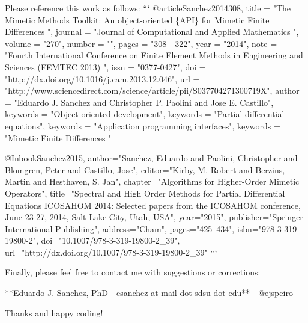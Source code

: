 \begin{DoxyVerbInclude}
Please reference this work as follows:
```
@article{Sanchez2014308,
  title = "The Mimetic Methods Toolkit: An object-oriented \{API\} for Mimetic
Finite Differences ",
  journal = "Journal of Computational and Applied Mathematics ",
  volume = "270",
  number = "",
  pages = "308 - 322",
  year = "2014",
  note = "Fourth International Conference on Finite Element Methods in
Engineering and Sciences (FEMTEC 2013) ",
  issn = "0377-0427",
  doi = "http://dx.doi.org/10.1016/j.cam.2013.12.046",
  url = "http://www.sciencedirect.com/science/article/pii/S037704271300719X",
  author = "Eduardo J. Sanchez and Christopher P. Paolini and Jose E. Castillo",
  keywords = "Object-oriented development",
  keywords = "Partial differential equations",
  keywords = "Application programming interfaces",
  keywords = "Mimetic Finite Differences "
}

@Inbook{Sanchez2015,
  author="Sanchez, Eduardo and Paolini, Christopher and Blomgren, Peter
and Castillo, Jose",
  editor="Kirby, M. Robert and Berzins, Martin and Hesthaven, S. Jan",
  chapter="Algorithms for Higher-Order Mimetic Operators",
  title="Spectral and High Order Methods for Partial Differential Equations
ICOSAHOM 2014: Selected papers from the ICOSAHOM conference, June 23-27, 2014,
Salt Lake City, Utah, USA",
  year="2015",
  publisher="Springer International Publishing",
  address="Cham",
  pages="425--434",
  isbn="978-3-319-19800-2",
  doi="10.1007/978-3-319-19800-2_39",
  url="http://dx.doi.org/10.1007/978-3-319-19800-2_39"
}
```

Finally, please feel free to contact me with suggestions or corrections:

**Eduardo J. Sanchez, PhD - esanchez at mail dot sdsu dot edu** - @ejspeiro

Thanks and happy coding!
\end{DoxyVerbInclude}
 